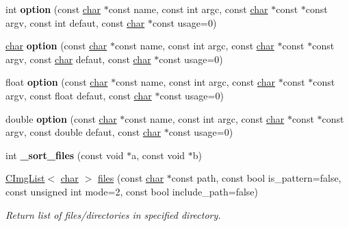\begin{DoxyCompactItemize}
\item 
\mbox{\label{namespacecimg__library__suffixed_1_1cimg_a90aad29cff98ece078b6b5efe1873b71}} 
int {\bfseries option} (const \hyperlink{classchar}{char} $\ast$const name, const int argc, const \hyperlink{classchar}{char} $\ast$const $\ast$const argv, const int defaut, const \hyperlink{classchar}{char} $\ast$const usage=0)
\item 
\mbox{\label{namespacecimg__library__suffixed_1_1cimg_a86072bfe08267f18ba8ab2422d7e9d9a}} 
\hyperlink{classchar}{char} {\bfseries option} (const \hyperlink{classchar}{char} $\ast$const name, const int argc, const \hyperlink{classchar}{char} $\ast$const $\ast$const argv, const \hyperlink{classchar}{char} defaut, const \hyperlink{classchar}{char} $\ast$const usage=0)
\item 
\mbox{\label{namespacecimg__library__suffixed_1_1cimg_a12b6391098c368ed6f7c833e8dd3c1d9}} 
float {\bfseries option} (const \hyperlink{classchar}{char} $\ast$const name, const int argc, const \hyperlink{classchar}{char} $\ast$const $\ast$const argv, const float defaut, const \hyperlink{classchar}{char} $\ast$const usage=0)
\item 
\mbox{\label{namespacecimg__library__suffixed_1_1cimg_a8d1f9f45fbebed66093dd36c9a4b70a8}} 
double {\bfseries option} (const \hyperlink{classchar}{char} $\ast$const name, const int argc, const \hyperlink{classchar}{char} $\ast$const $\ast$const argv, const double defaut, const \hyperlink{classchar}{char} $\ast$const usage=0)
\item 
\mbox{\label{namespacecimg__library__suffixed_1_1cimg_add25d3bf42363c07ad95d4a9a689f729}} 
int {\bfseries \+\_\+sort\+\_\+files} (const void $\ast$a, const void $\ast$b)
\item 
\hyperlink{structcimg__library__suffixed_1_1CImgList}{C\+Img\+List}$<$ \hyperlink{classchar}{char} $>$ \hyperlink{namespacecimg__library__suffixed_1_1cimg_a9f8980f1308177adebab5f8f52a79835}{files} (const \hyperlink{classchar}{char} $\ast$const path, const bool is\+\_\+pattern=false, const unsigned int mode=2, const bool include\+\_\+path=false)
\begin{DoxyCompactList}\small\item\em Return list of files/directories in specified directory. \end{DoxyCompactList}\item 

\end{DoxyCompactItemize}
